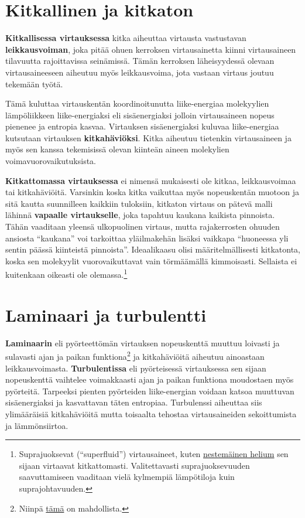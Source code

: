 \documentclass[12pt,a4paper,finnish]{book}
\begin{document}
\section{Kitkallinen ja kitkaton}
\textbf{Kitkallisessa virtauksessa} kitka aiheuttaa virtausta vastustavan \textbf{leikkausvoiman},
joka pitää ohuen kerroksen virtausainetta kiinni virtausaineen tilavuutta rajoittavissa seinämissä. 
Tämän kerroksen läheisyydessä olevaan virtausaineeseen aiheutuu myös leikkausvoima, jota vastaan 
virtaus joutuu tekemään työtä. 

Tämä kuluttaa virtauskentän koordinoitunutta liike-energiaa 
molekyylien lämpöliikkeen liike-energiaksi eli sisäenergiaksi jolloin virtausaineen nopeus 
pienenee ja entropia kasvaa. Virtauksen sisäenergiaksi kuluvaa liike-energiaa kutsutaan virtauksen 
\textbf{kitkahäviöksi}. Kitka aiheutuu tietenkin virtausaineen ja myös sen kanssa tekemisissä olevan 
kiinteän aineen molekylien voimavuorovaikutuksista.

\textbf{Kitkattomassa virtauksessa} ei nimensä mukaisesti ole kitkaa, leikkausvoimaa tai kitkahäviöitä. 
Varsinkin koska kitka vaikuttaa myös nopeuskentän muotoon ja sitä kautta suunnilleen kaikkiin tuloksiin, 
kitkaton virtaus on pätevä malli lähinnä \textbf{vapaalle virtaukselle}, joka tapahtuu kaukana 
kaikista pinnoista. Tähän vaaditaan yleensä ulkopuolinen virtaus, mutta rajakerrosten 
ohuuden ansiosta ``kaukana'' voi tarkoittaa yläilmakehän lisäksi vaikkapa ``huoneessa yli sentin 
päässä kiinteistä pinnoista''. Ideaalikaasu olisi määritelmällisesti kitkatonta,
koska sen molekyylit vuorovaikuttavat vain törmäämällä kimmoisasti. Sellaista ei kuitenkaan oikeasti 
ole olemassa.\footnote{Suprajuoksevat (``superfluid'') virtausaineet, kuten 
\href{http://www.youtube.com/watch?v=2Z6UJbwxBZI}{nestemäinen helium} sen sijaan virtaavat kitkattomasti. 
Valitettavasti suprajuoksevuuden saavuttamiseen vaaditaan vielä kylmempiä lämpötiloja kuin suprajohtavuuden.}

\section{Laminaari ja turbulentti}
\textbf{Laminaarin} eli pyörteettömän virtauksen nopeuskenttä muuttuu loivasti ja sulavasti ajan 
ja paikan funktiona\footnote{Niinpä 
\href{http://www.newscientist.com/blogs/nstv/2011/08/born-to-be-viral-how-to-unmix-a-mixed-fluid.html}
{tämä} on mahdollista.} ja kitkahäviöitä aiheutuu ainoastaan leikkausvoimasta. \textbf{Turbulentissa} 
eli pyörteisessä virtauksessa sen sijaan nopeuskenttä vaihtelee voimakkaasti ajan ja paikan funktiona 
moudostaen myös pyörteitä. Tarpeeksi pienten pyörteiden liike-energian voidaan katsoa muuttuvan 
sisäenergiaksi ja kasvattavan täten entropiaa. Turbulenssi aiheuttaa siis ylimääräisiä kitkahäviöitä 
mutta toisaalta tehostaa virtausaineiden sekoittumista ja lämmönsiirtoa.
\end{document}
